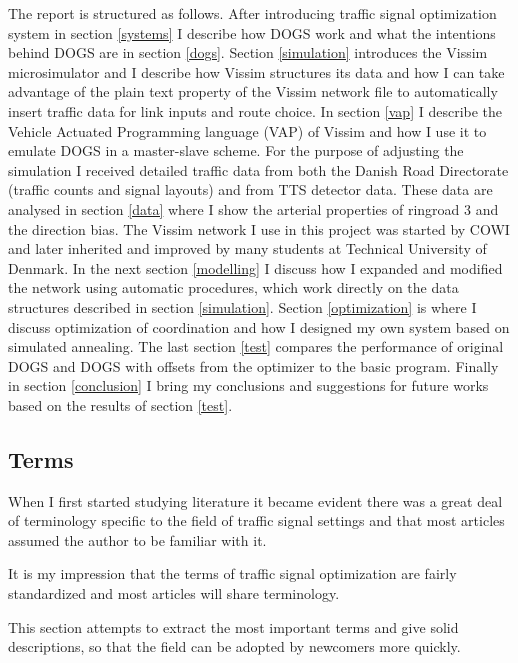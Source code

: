 The report is structured as follows. After introducing traffic signal optimization system in section \ref{systems} I describe how DOGS work and what the intentions behind DOGS are in section \ref{dogs}. Section \ref{simulation} introduces the Vissim microsimulator and I describe how Vissim structures its data and how I can take advantage of the plain text property of the Vissim network file to automatically insert traffic data for link inputs and route choice. In section \ref{vap} I describe the Vehicle Actuated Programming language (VAP) of Vissim and how I use it to emulate DOGS in a master-slave scheme. For the purpose of adjusting the simulation I received detailed traffic data from both the Danish Road Directorate (traffic counts and signal layouts) and from TTS detector data. These data are analysed in section \ref{data} where I show the arterial properties of ringroad 3 and the direction bias. The Vissim network I use in this project was started by COWI and later inherited and improved by many students at Technical University of Denmark. In the next section \ref{modelling} I discuss how I expanded and modified the network using automatic procedures, which work directly on the data structures described in section \ref{simulation}. Section \ref{optimization} is where I discuss optimization of coordination and how I designed my own system based on simulated annealing. The last section \ref{test} compares the performance of original DOGS and DOGS with offsets from the optimizer to the basic program. Finally in section \ref{conclusion} I bring my conclusions and suggestions for future works based on the results of section \ref{test}.

\subsection{Terms}
\label{vocabulary}
When I first started studying literature \cite{forprojekt} it became evident there was a great deal of terminology specific to the field of traffic signal settings and that most articles assumed the author to be familiar with it. 

It is my impression that the terms of traffic signal optimization are fairly standardized and most articles will share terminology.

This section attempts to extract the most important terms and give solid descriptions, so that the field can be adopted by newcomers more quickly.

